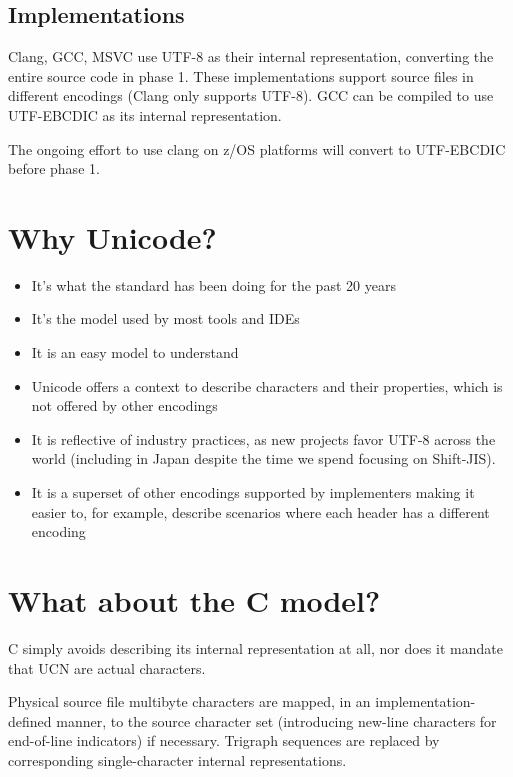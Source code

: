 \documentclass{wg21}
\begin{document}
\subsection{Implementations}

Clang, GCC, MSVC use UTF-8 as their internal representation, converting the entire source code in phase 1.
These implementations support source files in different encodings (Clang only supports UTF-8).
GCC can be compiled to use UTF-EBCDIC as its internal representation.

The ongoing effort to use clang on z/OS platforms will convert to UTF-EBCDIC before phase 1.


\section{Why Unicode?}

\begin{itemize}
    \item It's what the standard has been doing for the past 20 years
    \item It's the model used by most tools and IDEs
    \item It is an easy model to understand
    \item Unicode offers a context to describe characters and their properties, which is not offered by other encodings
    \item It is reflective of industry practices, as new projects favor UTF-8 across the world (including in Japan despite the time we spend focusing on Shift-JIS).
    \item It is a superset of other encodings supported by implementers making it easier to, for example, describe scenarios where each header has a different encoding
\end{itemize}

\section{What about the C model?}

C simply avoids describing its internal representation at all, nor does it mandate that UCN are actual characters.

\begin{quoteblock}
Physical source file multibyte characters are mapped, in an implementation-defined manner, to
the source character set (introducing new-line characters for end-of-line indicators) if necessary.
Trigraph sequences are replaced by corresponding single-character internal representations.
\end{quoteblock}
\end{document}
